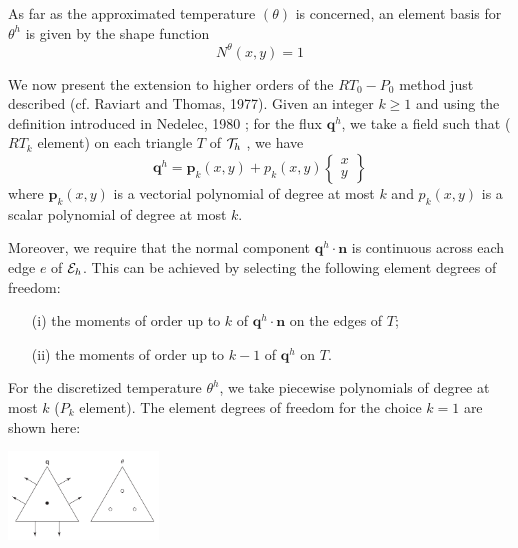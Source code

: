 \begin{itemize}
\begin{displayquote}
{As far as the approximated temperature $(\theta)$ is concerned, an
element basis for $\theta^h$ is given by the shape function
\[
N^\theta (x,y)=1
\]

We now present the extension to
higher orders of the $RT_0-P_0$ method just described (cf.
Raviart and Thomas, 1977). Given an integer $k \ge 1$ and
using the definition introduced in Nedelec, 1980 \cite{nede80}; for the
flux ${\bm q}^h$, we take a field such that ($RT_k$ element) on each
triangle $T$ of ${\cal T}_h$ , we have
\[
{\bm q}^h = {\bm p}_k(x,y) + p_k(x,y)
\left\{
\begin{array}{c}
x \\ y
\end{array}
\right\}
\]
where 
${\bm p}_k(x,y)$ is a vectorial polynomial of degree at most $k$ and 
${p}_k(x,y)$ is a scalar polynomial of degree at most $k$.

Moreover, we require
that the normal component ${\bm q}^h\cdot {\bm n}$ is continuous across
each edge $e$ of ${\cal E}_h$. This can be achieved by selecting the
following element degrees of freedom:
\begin{itemize}
\item[(i)] the moments of order up to $k$ of ${\bm q}^h\cdot{\bm n}$ on the edges of $T$;
\item[(ii)] the moments of order up to $k-1$ of ${\bm q}^h$ on $T$.
\end{itemize}

For the discretized temperature $\theta^h$, we take piecewise
polynomials of degree at most $k$ ($P_k$ element).
The element degrees of freedom for the choice $k = 1$ are
shown here:

\begin{center}
\includegraphics[width=4cm]{images/pair_raviart-thomas/aubb17a}
\end{center}

}
\end{displayquote}
\end{itemize}
